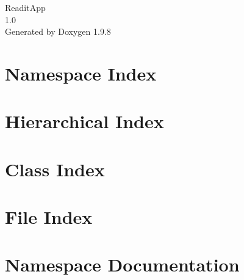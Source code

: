 \documentclass[twoside]{book}
\newcommand{\+}{\discretionary{\mbox{\scriptsize$\hookleftarrow$}}{}{}}
\newcommand{\clearemptydoublepage}{%
    \newpage{\pagestyle{empty}\cleardoublepage}%
  }
\begin{document}
  \raggedbottom
    \hypersetup{pageanchor=false,
                bookmarksnumbered=true,
                pdfencoding=unicode
               }
  \begin{titlepage}
  \vspace*{7cm}
  \begin{center}%
  {\Large Readit\+App}\\
  [1ex]\large 1.\+0 \\
  \vspace*{1cm}
  {\large Generated by Doxygen 1.9.8}\\
  \end{center}
  \end{titlepage}
  \clearemptydoublepage
  \tableofcontents
  \clearemptydoublepage
  \hypersetup{pageanchor=true}


\chapter{Namespace Index}

\chapter{Hierarchical Index}

\chapter{Class Index}

\chapter{File Index}

\chapter{Namespace Documentation}


















\end{document}
